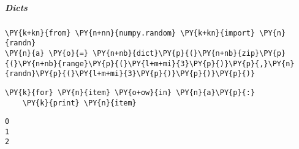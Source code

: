     \subparagraph{Dicts}



{\par%
\vspace{-1\baselineskip}%
}%
\begin{notebookcell}[13]%
\begin{addmargin}[\cellleftmargin]{0em}%
{\smaller%
\par%
%
\vspace{-1\smallerfontscale}%
\begin{Verbatim}[commandchars=\\\{\}]
\PY{k+kn}{from} \PY{n+nn}{numpy.random} \PY{k+kn}{import} \PY{n}{randn}
\PY{n}{a} \PY{o}{=} \PY{n+nb}{dict}\PY{p}{(}\PY{n+nb}{zip}\PY{p}{(}\PY{n+nb}{range}\PY{p}{(}\PY{l+m+mi}{3}\PY{p}{)}\PY{p}{,}\PY{n}{randn}\PY{p}{(}\PY{l+m+mi}{3}\PY{p}{)}\PY{p}{)}\PY{p}{)}
\end{Verbatim}
%
\par%
\vspace{-1\smallerfontscale}}%
\end{addmargin}
\end{notebookcell}



{\par%
\vspace{-1\baselineskip}%
}%
\begin{notebookcell}[15]%
\begin{addmargin}[\cellleftmargin]{0em}%
{\smaller%
\par%
%
\vspace{-1\smallerfontscale}%
\begin{Verbatim}[commandchars=\\\{\}]
\PY{k}{for} \PY{n}{item} \PY{o+ow}{in} \PY{n}{a}\PY{p}{:}
    \PY{k}{print} \PY{n}{item}
\end{Verbatim}
%
\par%
\vspace{-1\smallerfontscale}}%
\end{addmargin}
\end{notebookcell}

\par\vspace{1\smallerfontscale}%
    \begin{addmargin}[\cellleftmargin]{0em}%
    {\smaller%
    \vspace{-1\smallerfontscale}%
    
    \begin{Verbatim}[commandchars=\\\{\}]
0
1
2
    \end{Verbatim}
}%
    \end{addmargin}%

